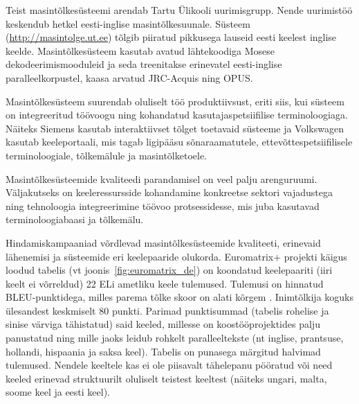 \begin{multicols}{2}
Teist masintõlkesüsteemi arendab Tartu Ülikooli uurimisgrupp.  Nende uurimistöö keskendub hetkel eesti-inglise masintõlkesuunale.  Süsteem (\url{http://masintolge.ut.ee}) tõlgib piiratud pikkusega lauseid eesti keelest inglise keelde.  Masintõlkesüsteem kasutab avatud lähtekoodiga Mosese dekodeerimismooduleid ja seda treenitakse erinevatel eesti-inglise paralleelkorpustel, kaasa arvatud JRC-Acquis ning OPUS.

Masintõlkesüsteem suurendab oluliselt töö produktiivsust, eriti siis, kui süsteem on integreeritud töövoogu ning kohandatud kasutajaspetsiifilise terminoloogiaga.  Näiteks Siemens kasutab interaktiivset tõlget toetavaid süsteeme ja Volkswagen kasutab keeleportaali, mis tagab ligipääsu sõnaraamatutele, ettevõttespetsiifilisele terminoloogiale, tõlkemälule ja masintõlketoele.

Masintõlkesüsteemide kvaliteedi parandamisel on veel palju arenguruumi.  Väljakutseks on keeleressursside kohandamine konkreetse sektori vajadustega ning tehnoloogia integreerimine töövoo protsessidesse, mis juba kasutavad terminoloogiabaasi ja tõlkemälu.

Hindamiskampaaniad võrdlevad masintõlkesüsteemide kvaliteeti, erinevaid lähenemisi ja süsteemide eri keelepaaride olukorda.  Euromatrix+ projekti käigus loodud tabelis (vt joonis~\ref{fig:euromatrix_de}) on koondatud keelepaariti (iiri keelt ei võrreldud) 22 ELi ametliku keele tulemused.  Tulemusi on hinnatud BLEU-punktidega, milles parema tõlke skoor on alati kõrgem \cite{bleu1}.  Inimtõlkija koguks ülesandest keskmiselt 80 punkti.  Parimad punktisummad (tabelis rohelise ja sinise värviga tähistatud) said keeled, millesse on koostööprojektides palju panustatud ning mille jaoks leidub rohkelt paralleeltekste (nt inglise, prantsuse, hollandi, hispaania ja saksa keel).  Tabelis on punasega märgitud halvimad tulemused.  Nendele keeltele kas ei ole piisavalt tähelepanu pööratud või need keeled erinevad struktuurilt oluliselt teistest keeltest (näiteks ungari, malta, soome keel ja eesti keel).


\end{multicols}
